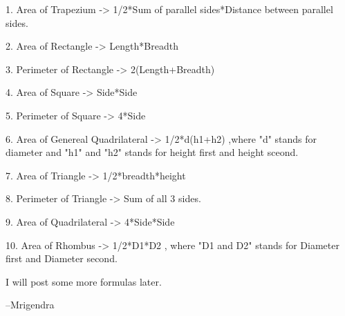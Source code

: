 \documentclass[12pt]{article}
\begin{document}
1. Area of Trapezium -> 1/2*Sum of parallel sides*Distance between parallel sides.

2. Area of Rectangle -> Length*Breadth 

3. Perimeter of Rectangle -> 2(Length+Breadth) 

4. Area of Square -> Side*Side 

5. Perimeter of Square -> 4*Side 

6. Area of Genereal Quadrilateral -> 1/2*d(h1+h2) ,where "d" stands for diameter and "h1" and "h2" stands for height first and height sceond. 

7. Area of Triangle -> 1/2*breadth*height 

8. Perimeter of Triangle -> Sum of all 3 sides. 

9. Area of Quadrilateral -> 4*Side*Side 

10. Area of Rhombus -> 1/2*D1*D2 , where "D1 and D2" stands for Diameter first and Diameter second. 

I will post some more formulas later.

--Mrigendra

\end{document}
